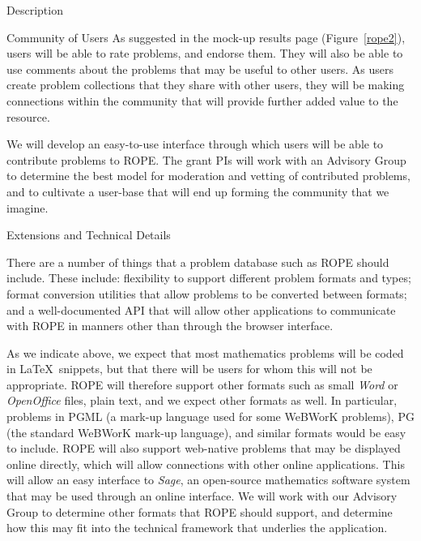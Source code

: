 \documentclass[11pt]{article}
\begin{document}
\begin{section}{Description}
\begin{subsection}{Community of Users}
As suggested in the mock-up results page (Figure~\ref{rope2}), users will
be able to rate problems, and endorse them.  They will also be
able to use comments about the problems that may be useful to other
users.  As users create problem collections that they share
with other users, they will be making connections within the community
that will provide further added value to the resource.  

We will develop an easy-to-use interface through which 
users will be able to contribute
problems to ROPE.  The grant PIs will work with an Advisory Group to
determine the best model for moderation and vetting of contributed
problems, and to cultivate a user-base that will end up forming the
community that we imagine.

\end{subsection}

\begin{subsection}{Extensions and Technical Details}

There are a number of things that a problem database such as ROPE should
include.  These include: flexibility to support different problem formats
and types; format conversion utilities that allow problems to be converted
between formats; and a well-documented API that will allow other
applications to communicate with ROPE in manners other than through the
browser interface.

As we indicate above, we expect that most mathematics problems will be
coded in \LaTeX\ snippets, but that there will be users for whom this will
not be appropriate.  ROPE will therefore support other formats such as
small \emph{Word} or \emph{OpenOffice} files, plain text, and we expect
other formats as well.  In particular, problems in PGML (a mark-up
language used for some WeBWorK problems), PG (the standard WeBWorK mark-up
language), and similar formats would be easy to include.  ROPE will also
support web-native problems that may be displayed online
directly, which will allow connections with other online applications.
This will allow an easy interface to \emph{Sage}, an open-source
mathematics software system that may be used through an online interface.  We
will work with our Advisory Group to determine other formats that ROPE
should support, and determine how this may fit into the technical
framework that underlies the application.


\end{subsection}
\end{section}
\end{document}
